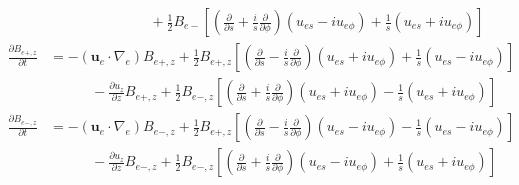 \begin{align*}
    &\qquad \qquad \qquad \quad \, + \frac{1}{2} B_{e-} \left[\left(\frac{\partial}{\partial s} + \frac{i}{s}\frac{\partial}{\partial \phi}\right) \left(u_{es} - iu_{e\phi}\right) + \frac{1}{s} \left(u_{es} + i u_{e\phi}\right)\right] \\ 
    \frac{\partial B_{e+,z}}{\partial t} &= - \left(\mathbf{u}_e \cdot \nabla_e\right) B_{e+,z} + \frac{1}{2} B_{e+,z} \left[\left(\frac{\partial}{\partial s} - \frac{i}{s}\frac{\partial}{\partial \phi}\right) \left(u_{es} + iu_{e\phi}\right) + \frac{1}{s} \left(u_{es} - i u_{e\phi}\right)\right] \\ 
    &\qquad \quad - \frac{\partial u_z}{\partial z} B_{e+,z} + \frac{1}{2} B_{e-,z} \left[\left(\frac{\partial}{\partial s} + \frac{i}{s}\frac{\partial}{\partial \phi}\right) \left(u_{es} + iu_{e\phi}\right) - \frac{1}{s} \left(u_{es} + i u_{e\phi}\right)\right] \\ 
    \frac{\partial B_{e-,z}}{\partial t} &= - \left(\mathbf{u}_e \cdot \nabla_e\right) B_{e-,z} + \frac{1}{2} B_{e+,z} \left[\left(\frac{\partial}{\partial s} - \frac{i}{s}\frac{\partial}{\partial \phi}\right) \left(u_{es} - iu_{e\phi}\right) - \frac{1}{s} \left(u_{es} - i u_{e\phi}\right)\right] \\ 
    &\qquad \quad - \frac{\partial u_z}{\partial z} B_{e-,z} + \frac{1}{2} B_{e-,z} \left[\left(\frac{\partial}{\partial s} + \frac{i}{s}\frac{\partial}{\partial \phi}\right) \left(u_{es} - iu_{e\phi}\right) + \frac{1}{s} \left(u_{es} + i u_{e\phi}\right)\right]
\end{align*}

